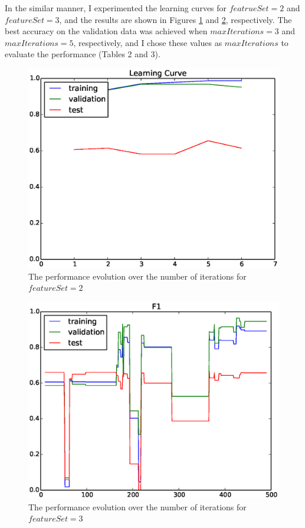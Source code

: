 In the similar manner, I experimented the learning curves for $featrueSet=2$ and $featureSet=3$, and the results are shown in Figures \ref{fig:learning_curve_2} and \ref{fig:learning_curve_3}, respectively. The best accuracy on the validation data was achieved when $maxIterations=3$ and $maxIterations=5$, respectively, and I chose these values as $maxIterations$ to evaluate the performance (Tables 2 and 3).

\begin{figure}[hbtp]
\centering
\includegraphics[width=130mm]{learning_curve_2}
\caption{The performance evolution over the number of iterations for $featureSet=2$}
\label{fig:learning_curve_2}
\end{figure}

\begin{figure}[b]
\centering
\includegraphics[width=130mm]{learning_curve_3}
\caption{The performance evolution over the number of iterations for $featureSet=3$}
\label{fig:learning_curve_3}
\end{figure}

